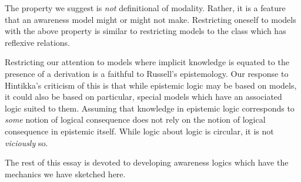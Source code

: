 The property we suggest is \emph{not} definitional of modality.  Rather, it is a
feature that an awareness model might or might not make.  Restricting
oneself to models with the above property is
similar to restricting models to the class which has reflexive
relations.

Restricting our attention to models where implicit knowledge is
equated to the presence
of a derivation is a faithful to Russell's epistemology.  Our response
to Hintikka's criticism of this is that while epistemic logic may be
based on models, it could also be based on particular, special models
which have an associated logic suited to them.  Assuming that
knowledge in epistemic logic corresponds to \emph{some} notion of logical consequence
does not rely on the notion of logical consequence in epistemic
itself.  While logic about logic is circular, it is not
\emph{viciously} so.

The rest of this essay is devoted to developing awareness logics which have
the mechanics we have sketched here.




